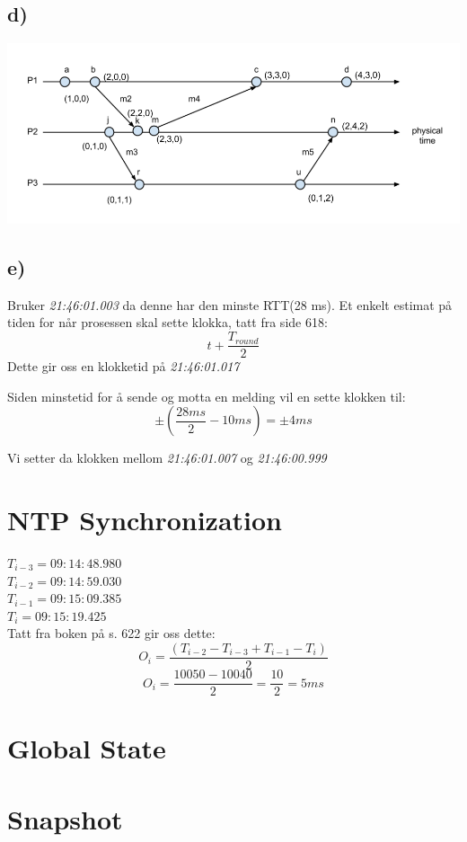 \documentclass{article}
\begin{document}
\subsection*{d)}
\includegraphics[scale=0.5]{Images/vector}
\subsection*{e)}
Bruker \emph{21:46:01.003} da denne har den minste RTT(28 ms). Et enkelt estimat på tiden for når prosessen skal sette klokka, tatt fra side 618: $$t + \frac{T_{round}}{2}$$ Dette gir oss en klokketid på \emph{21:46:01.017}

Siden minstetid for å sende og motta en melding vil en sette klokken til:
$$\pm (\frac{28 ms}{2} - 10 ms) = \pm 4 ms$$

Vi setter da klokken mellom \emph{21:46:01.007} og \emph{21:46:00.999}

\section{NTP Synchronization}
$T_{i-3} = 09:14:48.980$\\
$T_{i-2} = 09:14:59.030$\\
$T_{i-1} = 09:15:09.385$\\
$T_{i} = 09:15:19.425$\\

Tatt fra boken på s. 622 gir oss dette:
$$O_i = \frac{(T_{i-2} - T_{i-3} + T_{i-1} - T_i)}{2}$$
$$O_i = \frac{10050-10040}{2} = \frac{10}{2} = 5 ms$$
\section{Global State}
\section{Snapshot}
\end{document}
